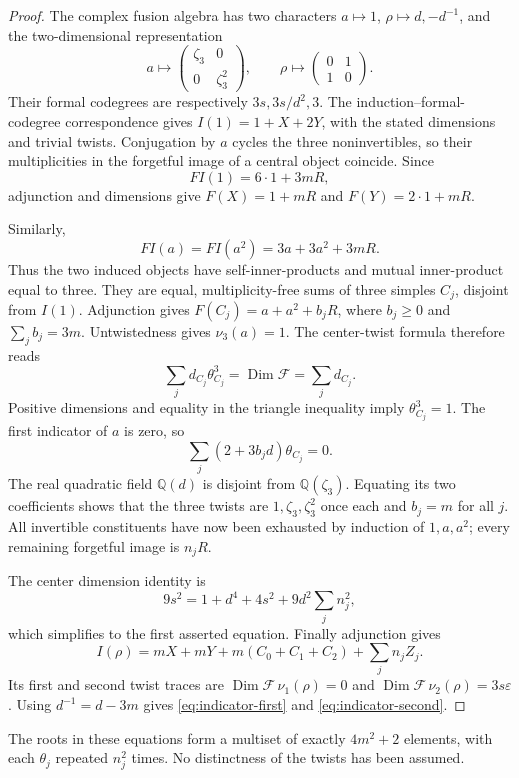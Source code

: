 \begin{proof}
The complex fusion algebra has two characters
$a\mapsto1$, $\rho\mapsto d,-d^{-1}$, and the two-dimensional
representation
\[
 a\longmapsto\begin{pmatrix}\zeta_3&0\\0&\zeta_3^2\end{pmatrix},
 \qquad \rho\longmapsto\begin{pmatrix}0&1\\1&0\end{pmatrix}.
\]
Their formal codegrees are respectively $3s,3s/d^2,3$.
The induction--formal-codegree correspondence
\cite[Theorems~2.5 and~2.13]{Ostrik13} gives
$I(1)=1+X+2Y$, with the stated dimensions and trivial twists.
Conjugation by $a$ cycles the three noninvertibles, so their
multiplicities in the forgetful image of a central object coincide.
Since
\[
 FI(1)=6\cdot1+3mR,
\]
adjunction and dimensions give $F(X)=1+mR$ and $F(Y)=2\cdot1+mR$.

Similarly,
\[
 FI(a)=FI(a^2)=3a+3a^2+3mR.
\]
Thus the two induced objects have self-inner-products and mutual
inner-product equal to three. They are equal, multiplicity-free sums
of three simples $C_j$, disjoint from $I(1)$. Adjunction gives
$F(C_j)=a+a^2+b_jR$, where $b_j\ge0$ and $\sum_jb_j=3m$.
Untwistedness gives $\nu_3(a)=1$. The center-twist formula
\cite[Theorem~4.1]{NS} therefore reads
\[
 \sum_jd_{C_j}\theta_{C_j}^3=\operatorname{Dim}\mathcal F
                         =\sum_jd_{C_j}.
\]
Positive dimensions and equality in the triangle inequality imply
$\theta_{C_j}^3=1$. The first indicator of $a$ is zero, so
\[
 \sum_j(2+3b_jd)\theta_{C_j}=0.
\]
The real quadratic field $\mathbb Q(d)$ is disjoint from
$\mathbb Q(\zeta_3)$. Equating its two coefficients shows that the
three twists are $1,\zeta_3,\zeta_3^2$ once each and $b_j=m$ for all
$j$. All invertible constituents have now been exhausted by induction
of $1,a,a^2$; every remaining forgetful image is $n_jR$.

The center dimension identity is
\[
 9s^2=1+d^4+4s^2+9d^2\sum_j n_j^2,
\]
which simplifies to the first asserted equation. Finally adjunction
gives
\[
 I(\rho)=mX+mY+m(C_0+C_1+C_2)+\sum_jn_jZ_j.
\]
Its first and second twist traces are
$\operatorname{Dim}\mathcal F\,\nu_1(\rho)=0$ and
$\operatorname{Dim}\mathcal F\,\nu_2(\rho)=3s\varepsilon$.
Using $d^{-1}=d-3m$ gives \eqref{eq:indicator-first} and
\eqref{eq:indicator-second}.
\end{proof}

The roots in these equations form a multiset of exactly $4m^2+2$
elements, with each $\theta_j$ repeated $n_j^2$ times. No distinctness
of the twists has been assumed.

